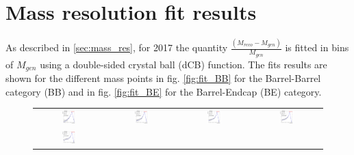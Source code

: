 \section{Mass resolution fit results}
\label{app:_mas_res}
As described in \ref{sec:mass_res}, for 2017 the quantity $\frac{(M_{reco} - M_{gen})}{M_{gen}}$ is fitted in bins of $M_{gen}$ using a double-sided crystal ball (dCB) function. The fits results are shown for the different mass points in fig. \ref{fig:fit_BB} for the Barrel-Barrel category (BB) and in fig. \ref{fig:fit_BE} for the Barrel-Endcap (BE) category.
\begin{figure}[ht]
  \begin{center}
    \begin{tabular}{cccc}
      \includegraphics[width=0.22\textwidth]{figures/Zprime/2017/mass_resolution/High_Mass/BB_120_200} &
      \includegraphics[width=0.22\textwidth]{figures/Zprime/2017/mass_resolution/High_Mass/BB_200_400}&
      \includegraphics[width=0.22\textwidth]{figures/Zprime/2017/mass_resolution/High_Mass/BB_400_800} &
      \includegraphics[width=0.22\textwidth]{figures/Zprime/2017/mass_resolution/High_Mass/BB_800_1400} \\
      \includegraphics[width=0.22\textwidth]{figures/Zprime/2017/mass_resolution/High_Mass/BB_1400_2300}& 

\end{tabular}
\end{center}
\end{figure}
